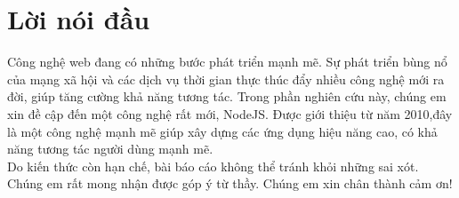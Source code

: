 ﻿\chapter*{Lời nói đầu}
   Công nghệ web đang có những bước phát triển mạnh mẽ. Sự phát triển bùng nổ của mạng xã hội và các dịch vụ thời gian thực thúc đẩy nhiều công nghệ mới ra đời, giúp tăng cường khả năng tương tác. Trong phần nghiên cứu này, chúng em xin đề cập đến một công nghệ rất mới, NodeJS. Được giới thiệu từ năm 2010,đây là một công nghệ mạnh mẽ giúp xây dựng các ứng dụng hiệu năng cao, có khả năng tương tác người dùng mạnh mẽ. \\
	Do kiến thức còn hạn chế, bài báo cáo không thể tránh khỏi những sai xót. Chúng em rất mong nhận được góp ý từ thầy. Chúng em xin chân thành cảm ơn!
